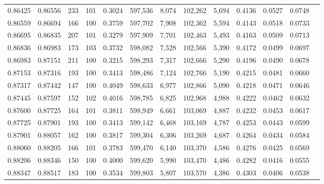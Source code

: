 \begin{tabular}{rrrrrrrrrrrrr}
0.86425 & 0.86556 &   233 & 101 &                                     0.3024 & 597,536 &   8,074 & 102,262 &   5,694 & 0.4136 & 0.0527 & 0.0748 \\
0.86559 & 0.86694 &   166 & 100 &                                     0.3759 & 597,702 &   7,908 & 102,362 &   5,594 & 0.4143 & 0.0518 & 0.0733 \\
0.86695 & 0.86835 &   207 & 101 &                                     0.3279 & 597,909 &   7,701 & 102,463 &   5,493 & 0.4163 & 0.0509 & 0.0713 \\
0.86836 & 0.86983 &   173 & 103 &                                     0.3732 & 598,082 &   7,528 & 102,566 &   5,390 & 0.4172 & 0.0499 & 0.0697 \\
0.86983 & 0.87151 &   211 & 100 &                                     0.3215 & 598,293 &   7,317 & 102,666 &   5,290 & 0.4196 & 0.0490 & 0.0678 \\
0.87153 & 0.87316 &   193 & 100 &                                     0.3413 & 598,486 &   7,124 & 102,766 &   5,190 & 0.4215 & 0.0481 & 0.0660 \\
0.87317 & 0.87442 &   147 & 100 &                                     0.4049 & 598,633 &   6,977 & 102,866 &   5,090 & 0.4218 & 0.0471 & 0.0646 \\
0.87445 & 0.87597 &   152 & 102 &                                     0.4016 & 598,785 &   6,825 & 102,968 &   4,988 & 0.4222 & 0.0462 & 0.0632 \\
0.87600 & 0.87725 &   164 & 101 &                                     0.3811 & 598,949 &   6,661 & 103,069 &   4,887 & 0.4232 & 0.0453 & 0.0617 \\
0.87725 & 0.87901 &   193 & 100 &                                     0.3413 & 599,142 &   6,468 & 103,169 &   4,787 & 0.4253 & 0.0443 & 0.0599 \\
0.87901 & 0.88057 &   162 & 100 &                                     0.3817 & 599,304 &   6,306 & 103,269 &   4,687 & 0.4264 & 0.0434 & 0.0584 \\
0.88060 & 0.88205 &   166 & 101 &                                     0.3783 & 599,470 &   6,140 & 103,370 &   4,586 & 0.4276 & 0.0425 & 0.0569 \\
0.88206 & 0.88346 &   150 & 100 &                                     0.4000 & 599,620 &   5,990 & 103,470 &   4,486 & 0.4282 & 0.0416 & 0.0555 \\
0.88347 & 0.88517 &   183 & 100 &                                     0.3534 & 599,803 &   5,807 & 103,570 &   4,386 & 0.4303 & 0.0406 & 0.0538 \\

\end{tabular}
